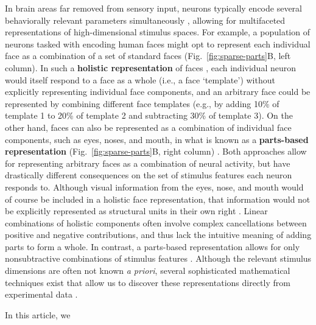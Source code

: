 In brain areas far removed from sensory input,
neurons typically encode several behaviorally relevant parameters
simultaneously \cite{Rigotti2013,Park2014,PaganRust2014,PougetSejnowski1997},
allowing for multifaceted representations of high-dimensional stimulus spaces.
For example, a population of neurons tasked with encoding human faces
might opt to represent each individual face as a combination of a set of
standard faces (Fig.~\ref{fig:sparse-parts}B, left column).
In such a \textbf{holistic representation} of faces \cite{TanakaFarah1993},
each individual neuron would itself respond to a face as a whole
(i.e., a face `template')
without explicitly representing individual face components,
and an arbitrary face could be represented by 
combining different face templates
(e.g., by adding 10\% of template 1 to 20\% of template 2
and subtracting 30\% of template 3).
On the other hand, faces can also be represented as a combination
of individual face components, such as eyes, noses, and mouth,
in what is known as a \textbf{parts-based representation}
(Fig.~\ref{fig:sparse-parts}B, right column) .
Both approaches allow for representing arbitrary faces as a combination of
neural activity, but have drastically different consequences on the
set of stimulus features each neuron responds to.
Although visual information from the eyes, nose, and mouth would of course be
included in a holistic face representation,
that information would not be explicitly represented as structural units
in their own right \cite{TanakaFarah1993}.
Linear combinations of holistic components often involve complex cancellations
between positive and negative contributions,
and thus lack the intuitive meaning of adding parts to form a whole.
In contrast, a parts-based representation allows for only nonsubtractive
combinations of stimulus features \cite{Palmer1977}.
Although the relevant stimulus dimensions are often not known \emph{a priori},
several sophisticated mathematical techniques exist that
allow us to discover these representations directly from experimental data
\cite{Brunton2016,CunninghamYu2014,PillowSimoncelli2006,Sharpee2014,Gao2017,ChangTsao2017}.

In this article, we 
